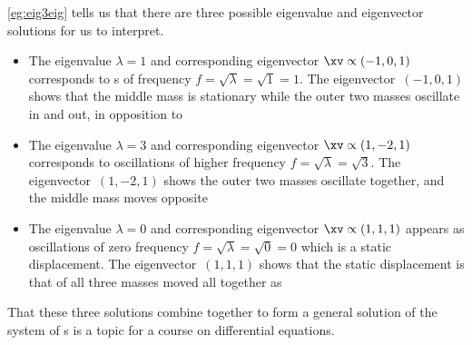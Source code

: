 \begin{example}
\cref{eg:eig3eig} tells us that there are three possible eigenvalue and eigenvector solutions for us to interpret.
\begin{itemize}
\item The eigenvalue \(\lambda=1\) and corresponding eigenvector \(\xv\propto(-1,0,1)\) corresponds to s of frequency \(f=\sqrt\lambda=\sqrt 1=1\).
The eigenvector~\((-1,0,1)\) shows that the middle mass is stationary while the outer two masses oscillate in and out, in opposition to 
\item The eigenvalue \(\lambda=3\) and corresponding eigenvector \(\xv\propto(1,-2,1)\) corresponds to oscillations of higher frequency \(f=\sqrt\lambda=\sqrt 3\).
The eigenvector~\((1,-2,1)\) shows the outer two masses oscillate together, and the middle mass moves opposite 
\item The eigenvalue \(\lambda=0\) and corresponding eigenvector \(\xv\propto(1,1,1)\) appears as oscillations of zero frequency \(f=\sqrt\lambda=\sqrt 0=0\) which is a static displacement.
The eigenvector~\((1,1,1)\) shows that the static displacement is that of all three masses moved all together as 
\end{itemize}
That these three solutions combine together to form a general solution of the system of s is a topic for a course on differential equations.
\end{example}




